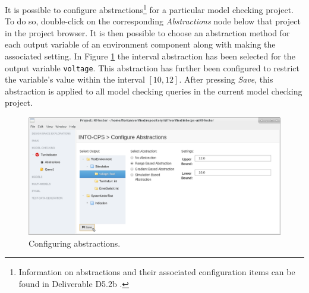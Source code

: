It is possible to configure
abstractions\footnote{Information on abstractions and their associated configuration items can be found in Deliverable D5.2b \cite{INTOCPSD5.2b}.} for a particular model checking project.
%
To do so, double-click on
the corresponding \emph{Abstractions} node below that project in the project browser.
It is then possible to choose an abstraction method for each output variable of an
environment component along with making the associated setting. In
Figure \ref{figure:INTO-CPS-App:Configure-Abstractions-Dialog} the interval abstraction has
been selected for the output variable \texttt{voltage}. This abstraction has further been
configured to restrict the variable's value within the interval $[10,12]$. After pressing
\emph{Save}, this abstraction is applied to all model checking queries in the current
model checking project.
%
%
%
\begin{figure}[ht]
    \centerline{\includegraphics[width=\textwidth]{figures/VSI-MC_Configure-Abstractions-Dialog.png}}
    \caption{Configuring abstractions.}
    \label{figure:INTO-CPS-App:Configure-Abstractions-Dialog}
\end{figure}
%
%
